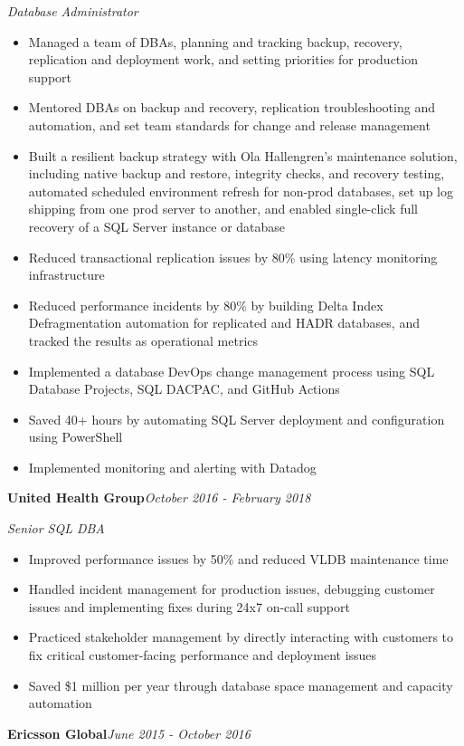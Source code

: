 \documentclass[10pt,a4paper]{article}
\begin{document}
\textit{Database Administrator}\\[-5pt]
\begin{itemize}
  \item Managed a team of DBAs, planning and tracking backup, recovery, replication and deployment work, and setting priorities for production support
  \item Mentored DBAs on backup and recovery, replication troubleshooting and automation, and set team standards for change and release management
  \item Built a resilient backup strategy with Ola Hallengren's maintenance solution, including native backup and restore, integrity checks, and recovery testing, automated scheduled environment refresh for non-prod databases, set up log shipping from one prod server to another, and enabled single-click full recovery of a SQL Server instance or database
  \item Reduced transactional replication issues by 80\% using latency monitoring infrastructure
  \item Reduced performance incidents by 80\% by building Delta Index Defragmentation automation for replicated and HADR databases, and tracked the results as operational metrics
  \item Implemented a database DevOps change management process using SQL Database Projects, SQL DACPAC, and GitHub Actions
  \item Saved 40+ hours by automating SQL Server deployment and configuration using PowerShell
  \item Implemented monitoring and alerting with Datadog
\end{itemize}
\vspace{14.7pt}
\noindent\textbf{United Health Group}\hfill \textit{October 2016 - February 2018}

\textit{Senior SQL DBA}\\[-5pt]
\begin{itemize}
  \item Improved performance issues by 50\% and reduced VLDB maintenance time
  \item Handled incident management for production issues, debugging customer issues and implementing fixes during 24x7 on-call support
  \item Practiced stakeholder management by directly interacting with customers to fix critical customer-facing performance and deployment issues
  \item Saved \$1 million per year through database space management and capacity automation
\end{itemize}
\vspace{14.7pt}
\noindent\textbf{Ericsson Global}\hfill \textit{June 2015 - October 2016}
\end{document}
